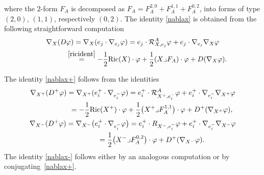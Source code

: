 \documentclass[10pt,a4paper]{amsart}
\numberwithin{equation}{section}
\theoremstyle{definition}
\begin{document}
where the $2$-form $F_A$ is decomposed as $F_A=F_A^{2,0}+F_A^{1,1}+F_A^{0,2}$, into forms of type $(2,0)$, $(1,1)$, respectively $(0,2)$.
The identity \eqref{nablax} is obtained from the following straightforward computation
\begin{gather*}
\nabla_X(D\varphi) =\nabla_X( e_j\cdot \nabla_{e_j}\varphi)= e_j\cdot \mathcal{R}^A_{X,e_j}\varphi+ e_j\cdot \nabla_{e_j}\nabla_X\varphi\\
 \hphantom{\nabla_X(D\varphi)}{} \overset{\eqref{ricident}}{=}-\frac{1}{2}{\mathop{\rm Ric}}(X)\cdot\varphi+\frac{1}{2}(X\lrcorner F_A)\cdot\varphi+D(\nabla_X \varphi).
\end{gather*}

The identity \eqref{nablax+} follows from the identities
\begin{gather*}
\nabla_{X^+}(D^+\varphi) =\nabla_{X^+}( e_i^+\cdot \nabla_{e_i^-}\varphi)= e_i^+\cdot \mathcal{R}^A_{X^+,e_i^-}\varphi+ e_i^+\cdot \nabla_{e_i^-}\nabla_{X^+}\varphi\\
\hphantom{\nabla_{X^+}(D^+\varphi)}{}
=-\frac{1}{2}\mathrm{Ric}(X^+)\cdot\varphi+\frac{1}{2}\big(X^+\lrcorner F^{1,1}_A\big)\cdot\varphi+D^+(\nabla_{X^+} \varphi),
\\
\nabla_{X^-}(D^+\varphi) =\nabla_{X^-}\big( e_i^+\cdot \nabla_{e_i^-}\varphi\big)= e_i^+\cdot R_{X^-,e_i^-}\varphi+ e_i^+\cdot \nabla_{e_i^-}\nabla_{X^-}\varphi\\
\hphantom{\nabla_{X^-}(D^+\varphi)}{}
=\frac{1}{2}\big(X^-\lrcorner F^{0,2}_A\big)\cdot\varphi+D^+(\nabla_{X^-} \varphi).
\end{gather*}
The identity \eqref{nablax-} follows either by an analogous computation or by  conjugating~\eqref{nablax+}.
\end{document}
